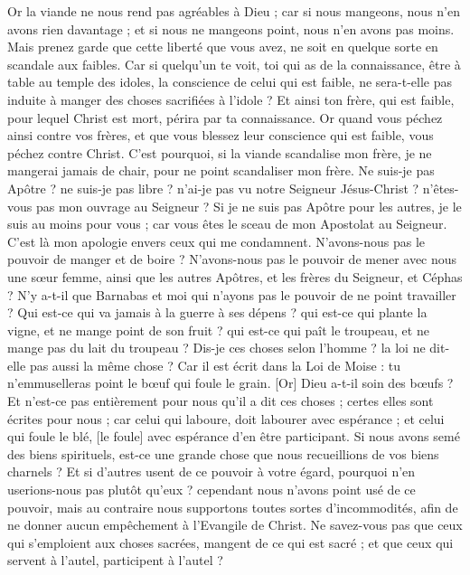\begin{multicols}{2}
Or la viande ne nous rend pas agréables à Dieu ; car si nous mangeons, nous n'en avons rien davantage ; et si nous ne mangeons point, nous n'en avons pas moins.
Mais prenez garde que cette liberté que vous avez, ne soit en quelque sorte en scandale aux faibles.
Car si quelqu'un te voit, toi qui as de la connaissance, être à table au temple des idoles, la conscience de celui qui est faible, ne sera-t-elle pas induite à manger des choses sacrifiées à l'idole ?
Et ainsi ton frère, qui est faible, pour lequel Christ est mort, périra par ta connaissance.
Or quand vous péchez ainsi contre vos frères, et que vous blessez leur conscience qui est faible, vous péchez contre Christ.
C'est pourquoi, si la viande scandalise mon frère, je ne mangerai jamais de chair, pour ne point scandaliser mon frère.
\VerseOne{}Ne suis-je pas Apôtre ? ne suis-je pas libre ? n’ai-je pas vu notre Seigneur Jésus-Christ ? n'êtes-vous pas mon ouvrage au Seigneur ?
Si je ne suis pas Apôtre pour les autres, je le suis au moins pour vous ; car vous êtes le sceau de mon Apostolat au Seigneur.
C'est là mon apologie envers ceux qui me condamnent.
N'avons-nous pas le pouvoir de manger et de boire ?
N'avons-nous pas le pouvoir de mener avec nous une sœur femme, ainsi que les autres Apôtres, et les frères du Seigneur, et Céphas ?
N'y a-t-il que Barnabas et moi qui n'ayons pas le pouvoir de ne point travailler ?
Qui est-ce qui va jamais à la guerre à ses dépens ? qui est-ce qui plante la vigne, et ne mange point de son fruit ? qui est-ce qui paît le troupeau, et ne mange pas du lait du troupeau ?
Dis-je ces choses selon l'homme ? la loi ne dit-elle pas aussi la même chose ?
Car il est écrit dans la Loi de Moise : tu n'emmuselleras point le bœuf qui foule le grain. [Or] Dieu a-t-il soin des bœufs ?
Et n'est-ce pas entièrement pour nous qu'il a dit ces choses ; certes elles sont écrites pour nous ; car celui qui laboure, doit labourer avec espérance ; et celui qui foule le blé, [le foule] avec espérance d'en être participant.
Si nous avons semé des biens spirituels, est-ce une grande chose que nous recueillions de vos biens charnels ?
Et si d'autres usent de ce pouvoir à votre égard, pourquoi n'en userions-nous pas plutôt qu'eux ? cependant nous n'avons point usé de ce pouvoir, mais au contraire nous supportons toutes sortes d'incommodités, afin de ne donner aucun empêchement à l'Evangile de Christ.
Ne savez-vous pas que ceux qui s'emploient aux choses sacrées, mangent de ce qui est sacré ; et que ceux qui servent à l'autel, participent à l'autel ?

\end{multicols}
